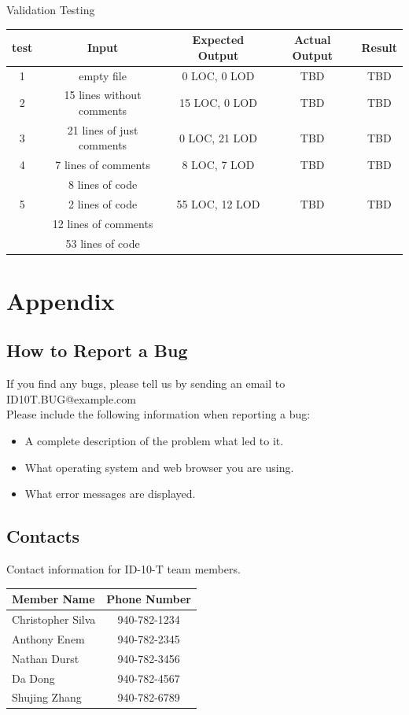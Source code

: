 \documentclass{scrreprt}
\begin{document}
	Validation Testing\\
	\begin{tabular}{|c|c|c|c|c|}
		\hline
		test & Input & Expected Output & Actual Output & Result \\ \hline
		1 & empty file & 0 LOC, 0 LOD & TBD & TBD\\ \hline
		2 & 15 lines without comments & 15 LOC, 0 LOD & TBD & TBD\\ \hline
		3 & 21 lines of just comments & 0 LOC, 21 LOD & TBD & TBD\\ \hline
		4 & 7 lines of comments & 8 LOC, 7 LOD &TBD&TBD\\ & 8 lines of code &&&\\ \hline
		5 &2 lines of code & 55 LOC, 12 LOD & TBD & TBD \\ & 12 lines of comments &&&\\ & 53 lines of code & &&\\ \hline
		
	\end{tabular}

	{\let\clearpage\relax \chapter{Appendix}}
	
	\section{How to Report a Bug}
	If you find any bugs, please tell us by sending an email to ID10T.BUG@example.com\\
	Please include the following information when reporting a bug:\\
	\begin{itemize}
		\item A complete description of the problem what led to it.
		\item What operating system and web browser you are using.
		\item What error messages are displayed.
	\end{itemize}
	
	\section{Contacts}
		Contact information for ID-10-T team members.\\
		\begin{tabular}{|l|c|}
			\hline
			Member Name       & Phone Number \\ \hline
			Christopher Silva & 940-782-1234 \\ \hline
			Anthony Enem      & 940-782-2345 \\ \hline
			Nathan Durst      & 940-782-3456 \\ \hline
			Da Dong           & 940-782-4567 \\ \hline
			Shujing Zhang     & 940-782-6789 \\ \hline
		\end{tabular}
	
\end{document}
